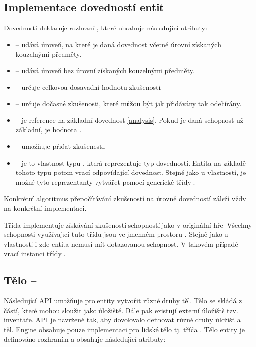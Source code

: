 \subsection{Implementace dovedností entit}

Dovednosti deklaruje rozhraní , které obsahuje následující atributy:
\begin{itemize}
\item {} -- udává úroveň, na které je daná dovednost včetně úrovní získaných kouzelnými předměty.
\item {} -- udává úroveň bez úrovní získaných kouzelnými předměty.
\item {}  -- určuje celkovou dosavadní hodnotu zkušeností.
\item {} -- určuje dočasné zkušenosti, které můžou být jak přidávány tak odebírány.
\item {} -- je reference na základní dovednost \vref{analysis}. Pokud je daná schopnost 
	už základní, je hodnota .
\item {} --  umožňuje přidat zkušenosti.
\item {} -- je to vlastnost typu , která reprezentuje typ dovednosti.  Entita na základě 
	tohoto typu potom vrací odpovídající dovednost. Stejně jako u vlastností, je možné tyto reprezentanty vytvářet pomocí generické třídy . 
\end{itemize}

Konkrétní algoritmus přepočítávání zkušeností na úrovně dovedností záleží vždy na konkrétní implementaci.  

Třída  implementuje získávání zkušeností schopností jako v originální hře. Všechny schopnosti 
využívající tuto třídu jsou ve jmenném prostoru . Stejně jako
u vlastností i zde entita nemusí mít dotazovanou schopnost. V takovém případě vrací instanci třídy .

\subsection{Tělo -- }

Následující API umožňuje pro entity vytvořit různé druhy těl.
Tělo se skládá z částí, které mohou sloužit jako úložiště. Dále pak existují externí
úložiště tzv. inventáře. API je navržené tak, aby dovolovalo definovat různé druhy úložišť a těl. 
Engine obsahuje pouze implementaci pro lidské tělo tj. třída .
Tělo entity je definováno rozhraním  a obsahuje následující atributy:

